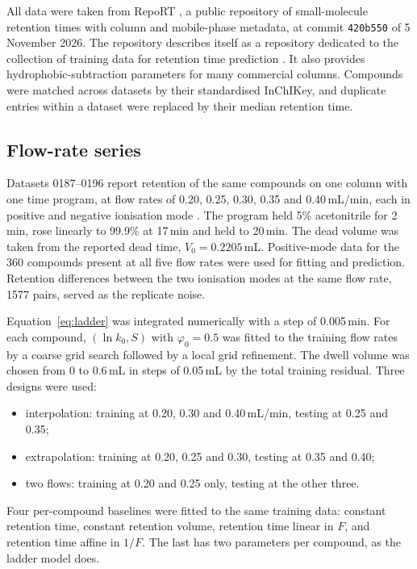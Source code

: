 \documentclass[11pt,a4paper]{article}
\theoremstyle{definition}
\theoremstyle{remark}
\begin{document}
All data were taken from RepoRT \citep{kretschmer2024}, a public repository of small-molecule retention times with column and mobile-phase metadata, at commit \texttt{420b550} of 5 November 2026.
The repository describes itself as a repository dedicated to the collection of training data for retention time prediction \citep{kretschmer2024}.
It also provides hydrophobic-subtraction parameters for many commercial columns.
Compounds were matched across datasets by their standardised InChIKey, and duplicate entries within a dataset were replaced by their median retention time.

\subsection{Flow-rate series}

Datasets 0187--0196 report retention of the same compounds on one column with one time program, at flow rates of 0.20, 0.25, 0.30, 0.35 and 0.40\,mL/min, each in positive and negative ionisation mode \citep{stoffel2021}.
The program held 5\% acetonitrile for 2\,min, rose linearly to 99.9\% at 17\,min and held to 20\,min.
The dead volume was taken from the reported dead time, $V_0=0.2205$\,mL.
Positive-mode data for the 360 compounds present at all five flow rates were used for fitting and prediction.
Retention differences between the two ionisation modes at the same flow rate, 1577 pairs, served as the replicate noise.

Equation~\eqref{eq:ladder} was integrated numerically with a step of 0.005\,min.
For each compound, $(\ln k_0,S)$ with $\varphi_0=0.5$ was fitted to the training flow rates by a coarse grid search followed by a local grid refinement.
The dwell volume was chosen from 0 to 0.6\,mL in steps of 0.05\,mL by the total training residual.
Three designs were used:
\begin{itemize}[leftmargin=2em,nosep]
\item interpolation: training at 0.20, 0.30 and 0.40\,mL/min, testing at 0.25 and 0.35;
\item extrapolation: training at 0.20, 0.25 and 0.30, testing at 0.35 and 0.40;
\item two flows: training at 0.20 and 0.25 only, testing at the other three.
\end{itemize}
Four per-compound baselines were fitted to the same training data: constant retention time, constant retention volume, retention time linear in $F$, and retention time affine in $1/F$.
The last has two parameters per compound, as the ladder model does.
\end{document}
